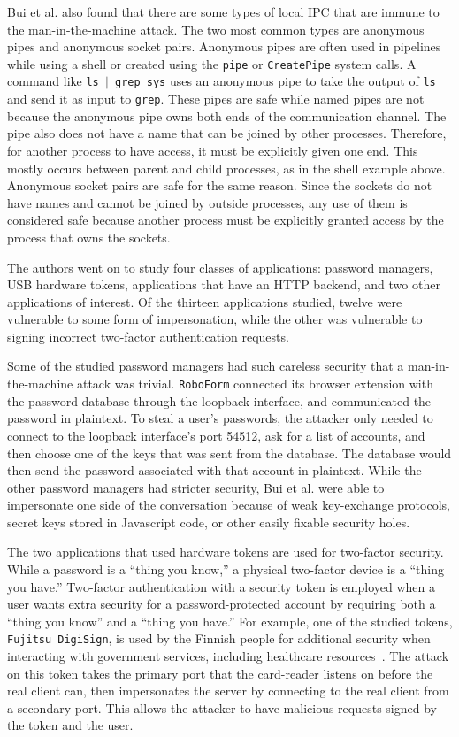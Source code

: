 Bui et al. also found that there are some types of local IPC that are immune to the man-in-the-machine attack.  The two most common types are anonymous pipes and anonymous socket pairs.  Anonymous pipes are often used in pipelines while using a shell or created using the \texttt{pipe} or \texttt{CreatePipe} system calls.  A command like \texttt{ls $|$ grep sys} uses an anonymous pipe to take the output of \texttt{ls} and send it as input to \texttt{grep}.  These pipes are safe while named pipes are not because the anonymous pipe owns both ends of the communication channel.  The pipe also does not have a name that can be joined by other processes.  Therefore, for another process to have access, it must be explicitly given one end.  This mostly occurs between parent and child processes, as in the shell example above.  Anonymous socket pairs are safe for the same reason.  Since the sockets do not have names and cannot be joined by outside processes, any use of them is considered safe because another process must be explicitly granted access by the process that owns the sockets.

The authors went on to study four classes of applications: password managers, USB hardware tokens, applications that have an HTTP backend, and two other applications of interest.  Of the thirteen applications studied, twelve were vulnerable to some form of impersonation, while the other was vulnerable to signing incorrect two-factor authentication requests.

Some of the studied password managers had such careless security that a man-in-the-machine attack was trivial.  \texttt{RoboForm} connected its browser extension with the password database through the loopback interface, and communicated the password in plaintext.  To steal a user's passwords, the attacker only needed to connect to the loopback interface's port 54512, ask for a list of accounts, and then choose one of the keys that was sent from the database.  The database would then send the password associated with that account in plaintext.  While the other password managers had stricter security, Bui et al. were able to impersonate one side of the conversation because of weak key-exchange protocols, secret keys stored in Javascript code, or other easily fixable security holes.

The two applications that used hardware tokens are used for two-factor security.  While a password is a ``thing you know,'' a physical two-factor device is a ``thing you have.''  Two-factor authentication with a security token is employed when a user wants extra security for a password-protected account by requiring both a ``thing you know'' and a ``thing you have.''  For example, one of the studied tokens, \texttt{Fujitsu DigiSign}, is used by the Finnish people for additional security when interacting with government services, including healthcare resources~\cite{MitMa}.  The attack on this token takes the primary port that the card-reader listens on before the real client can, then impersonates the server by connecting to the real client from a secondary port.  This allows the attacker to have malicious requests signed by the token and the user.

